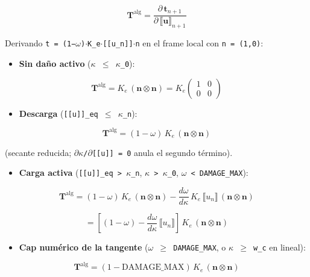 \documentclass[11pt,letterpaper,oneside]{report}
\begin{document}
\[
\mathbf T^\text{alg} = \frac{\partial\,\mathbf t_{n+1}}{\partial\,\llbracket\mathbf u\rrbracket_{n+1}}
\]

Derivando \texttt{t = (1−\ensuremath{\omega})\ensuremath{\cdot}K\_e\ensuremath{\cdot}[[u\_n]]\ensuremath{\cdot}n} en el frame local con \texttt{n = (1,0)}:

\begin{itemize}
  \item \textbf{Sin daño activo} (\texttt{\ensuremath{\kappa} \ensuremath{\le} \ensuremath{\kappa}\_0}):
\end{itemize}

\[
\mathbf T^\text{alg} = K_e\,(\mathbf n \otimes \mathbf n) = K_e\begin{pmatrix}1 & 0 \\ 0 & 0\end{pmatrix}
\]

\begin{itemize}
  \item \textbf{Descarga} (\texttt{[[u]]\_eq \ensuremath{\le} \ensuremath{\kappa}\_n}):
\end{itemize}

\[
\mathbf T^\text{alg} = (1-\omega)\,K_e\,(\mathbf n \otimes \mathbf n)
\]

(secante reducida; \texttt{\ensuremath{\partial}\ensuremath{\kappa}/\ensuremath{\partial}[[u]] = 0} anula el segundo término).

\begin{itemize}
  \item \textbf{Carga activa} (\texttt{[[u]]\_eq > \ensuremath{\kappa}\_n}, \texttt{\ensuremath{\kappa} > \ensuremath{\kappa}\_0}, \texttt{\ensuremath{\omega} < DAMAGE\_MAX}):
\end{itemize}

\[
\mathbf T^\text{alg} = (1-\omega)\,K_e\,(\mathbf n \otimes \mathbf n) - \frac{d\omega}{d\kappa}\,K_e\,\llbracket u_n\rrbracket\,(\mathbf n \otimes \mathbf n)
\]

\[
= \left[(1-\omega) - \frac{d\omega}{d\kappa}\,\llbracket u_n\rrbracket\right]\,K_e\,(\mathbf n \otimes \mathbf n)
\]

\begin{itemize}
  \item \textbf{Cap numérico de la tangente} (\texttt{\ensuremath{\omega} \ensuremath{\ge} DAMAGE\_MAX}, o \texttt{\ensuremath{\kappa} \ensuremath{\ge} w\_c} en lineal):
\end{itemize}

\[
\mathbf T^\text{alg} = (1-\text{DAMAGE\_MAX})\,K_e\,(\mathbf n \otimes \mathbf n)
\]
\end{document}
